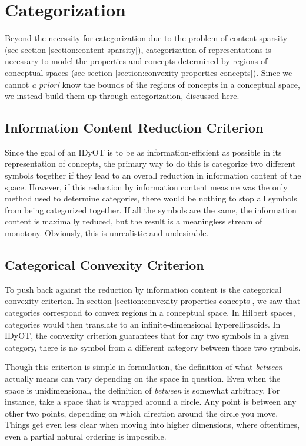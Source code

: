 \section{Categorization}
\label{section:categorization}

Beyond the necessity for categorization due to the problem of content sparsity (see section \ref{section:content-sparsity}), categorization of representations is necessary to model the properties and concepts determined by regions of conceptual spaces (see section \ref{section:convexity-properties-concepts}).  Since we cannot \textit{a priori} know the bounds of the regions of concepts in a conceptual space, we instead build them up through categorization, discussed here.

\subsection{Information Content Reduction Criterion} 
\label{section:information-content-reduction-criterion}

Since the goal of an IDyOT is to be as information-efficient as possible in its representation of concepts, the primary way to do this is categorize two different symbols together if they lead to an overall reduction in information content of the space.  However, if this reduction by information content measure was the only method used to determine categories, there would be nothing to stop all symbols from being categorized together.  If all the symbols are the same, the information content is maximally reduced, but the result is a meaningless stream of monotony.  Obviously, this is unrealistic and undesirable.

\subsection{Categorical Convexity Criterion}
\label{section:categorical-convexity-criterion}

To push back against the reduction by information content is the categorical convexity criterion.  In section \ref{section:convexity-properties-concepts}, we saw that categories correspond to convex regions in a conceptual space.  In Hilbert spaces, categories would then translate to an infinite-dimensional hyperellipsoids.  In IDyOT, the convexity criterion guarantees that for any two symbols in a given category, there is no symbol from a different category between those two symbols.

Though this criterion is simple in formulation, the definition of what \textit{between} actually means can vary depending on the space in question.  Even when the space is unidimensional, the definition of \textit{between} is somewhat arbitrary.  For instance, take a space that is wrapped around a circle.  Any point is between any other two points, depending on which direction around the circle you move.  Things get even less clear when moving into higher dimensions, where oftentimes, even a partial natural ordering is impossible.

